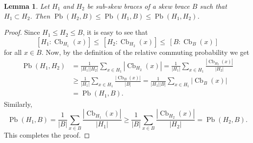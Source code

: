 \documentclass[10pt,a4paper]{amsart}
\numberwithin{equation}{section}
\newtheorem{lem}[equation]{Lemma}
\newcommand{\Cb}{\operatorname{Cb} }
\newcommand{\Pb}{\operatorname{Pb} }
\begin{document}
\begin{lem}
      Let $H_1$ and $H_2$ be  sub-skew braces of a skew brace $B$ such that $H_1\subset H_2$. Then 
      $\Pb(H_2,B)\leqslant \Pb(H_1,B)\leqslant \Pb(H_1,H_2)$.
\end{lem}
\begin{proof}
      Since $H_1\leqslant H_2\leqslant B$, it is easy to see that
      $$[H_1:\Cb_{H_1}(x)]\leqslant~[H_2:\Cb_{H_2}(x)]\leqslant~[B:\Cb_{B}(x)]$$
      for all $x\in B$. Now, by the definition of the relative commuting probability we get
      \begin{align*}
            \Pb(H_1,H_2)&=\frac{1}{|H_1||H_2|}\sum_{x\in H_1}|\Cb_{H_2}(x)| =\frac{1}{|H_1|}\sum_{x\in H_1}\frac{|\Cb_{H_2}(x)|}{|H_2|}\\
                     &\geqslant \frac{1}{|H_1|}\sum_{x\in H_1}\frac{|\Cb_{B}(x)|}{|B|} =\frac{1}{|H_1||B|}\sum_{x\in H_1}|\Cb_{B}(x)|\\
                     &=\Pb(H_1,B).
      \end{align*}
      Similarly,
      $$\Pb(H_1,B)  =  \frac{1}{|B|}\sum_{x\in B}\frac{|\Cb_{H_1}(x)|}{|H_1|} \geqslant \frac{1}{|B|}\sum_{x\in B}\frac{|\Cb_{H_2}(x)|}{|H_2|} = \Pb(H_2,B).$$
      This completes the proof.
\end{proof}
\end{document}
